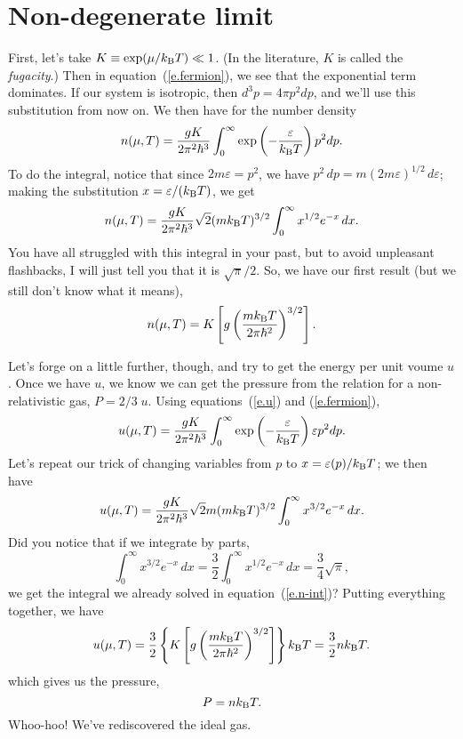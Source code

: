 \section{Non-degenerate limit}
First, let's take $K\equiv\exp(\mu/k_\mathrm{B} T)\ll 1$. (In the literature, $K$ is called the \emph{fugacity}.) Then in equation~(\ref{e.fermion}), we see that the exponential term dominates.  If our system is isotropic, then $d^{3}p = 4\pi p^{2}dp$, and we'll use this substitution from now on.  We then have for the number density
\begin{equation}
n(\mu,T) = \frac{gK}{2\pi^{2}\hbar^{3}}\int_{0}^{\infty}\exp\left(-\frac{\varepsilon}{k_\mathrm{B} T}\right) p^{2}dp.
\end{equation}
To do the integral, notice that since $2m\varepsilon = p^{2}$, we have $p^{2}\,dp = m(2m\varepsilon)^{1/2}\,d\varepsilon$; making the substitution $x = \varepsilon/(k_\mathrm{B} T)$, we get
\begin{equation}\label{e.n-int}
n(\mu,T) = \frac{gK}{2\pi^{2}\hbar^{3}}\sqrt{2}(mk_\mathrm{B} T)^{3/2}\int_{0}^{\infty} x^{1/2}e^{-x}\,dx.
\end{equation}
You have all struggled with this integral in your past, but to avoid unpleasant flashbacks, I will just tell you that it is $\sqrt{\pi}/2$.  So, we have our first result (but we still don't know what it means),
\begin{equation}\label{e.n-nondeg}
n(\mu,T) = K\left[g\left(\frac{mk_\mathrm{B} T}{2\pi\hbar^{2}}\right)^{3/2}\right].
\end{equation}

Let's forge on a little further, though, and try to get the energy per unit voume $u$.  Once we have $u$, we know we can get the pressure from the relation for a non-relativistic gas, $P = 2/3\;u$.  Using equations~(\ref{e.u}) and (\ref{e.fermion}),
\begin{equation}
u(\mu,T) = \frac{gK}{2\pi^{2}\hbar^{3}}\int_{0}^{\infty}\exp\left(-\frac{\varepsilon}{k_\mathrm{B} T}\right) \varepsilon p^{2}dp.
\end{equation}
Let's repeat our trick of changing variables from $p$ to $x = \varepsilon(p)/k_\mathrm{B} T$; we then have
\begin{equation}
u(\mu,T) = \frac{gK}{2\pi^{2}\hbar^{3}}\sqrt{2}m(mk_\mathrm{B} T)^{3/2}\int_{0}^{\infty} x^{3/2}e^{-x}\,dx.
\end{equation}
Did you notice that if we integrate by parts,
\[
\int_{0}^{\infty} x^{3/2}e^{-x}\,dx =  \frac{3}{2}\int_{0}^{\infty}x^{1/2}e^{-x}\,dx = \frac{3}{4}\sqrt{\pi},
\]
we get the integral we already solved in equation~(\ref{e.n-int})?  Putting everything together, we have
\begin{equation}
u(\mu,T) = \frac{3}{2}\left\{K\left[g\left(\frac{mk_\mathrm{B} T}{2\pi\hbar^{2}}\right)^{3/2}\right] \right\}k_\mathrm{B} T = \frac{3}{2}nk_\mathrm{B} T.
\end{equation}
which gives us the pressure,
\begin{equation}\label{e.PVnkT}
P = n k_\mathrm{B} T.
\end{equation}
Whoo-hoo!  We've rediscovered the ideal gas.

